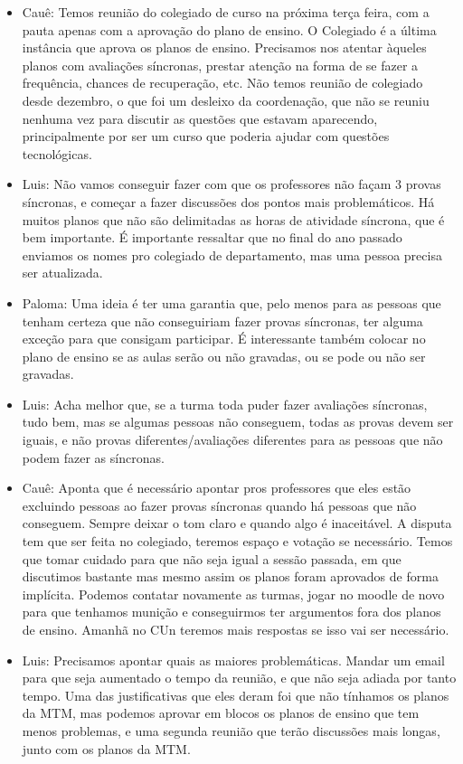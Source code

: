 \documentclass{ata-calico}
\begin{document}
\begin{itemize}
\item Cauê: Temos reunião do colegiado de curso na próxima terça feira, com a pauta apenas com a aprovação do plano de ensino. O Colegiado é a última instância que aprova os planos de ensino. Precisamos nos atentar àqueles planos com avaliações síncronas, prestar atenção na forma de se fazer a frequência, chances de recuperação, etc. Não temos reunião de colegiado desde dezembro, o que foi um desleixo da coordenação, que não se reuniu nenhuma vez para discutir as questões que estavam aparecendo, principalmente por ser um curso que poderia ajudar com questões tecnológicas.
\item Luis: Não vamos conseguir fazer com que os professores não façam 3 provas síncronas, e começar a fazer discussões dos pontos mais problemáticos. Há muitos planos que não são delimitadas as horas de atividade síncrona, que é bem importante. É importante ressaltar que no final do ano passado enviamos os nomes pro colegiado de departamento, mas uma pessoa precisa ser atualizada.
\item Paloma: Uma ideia é ter uma garantia que, pelo menos para as pessoas que tenham certeza que não conseguiriam fazer provas síncronas, ter alguma exceção para que consigam participar. É interessante também colocar no plano de ensino se as aulas serão ou não gravadas, ou se pode ou não ser gravadas.
\item Luis: Acha melhor que, se a turma toda puder fazer avaliações síncronas, tudo bem, mas se algumas pessoas não conseguem, todas as provas devem ser iguais, e não provas diferentes/avaliações diferentes para as pessoas que não podem fazer as síncronas.
\item Cauê: Aponta que é necessário apontar pros professores que eles estão excluindo pessoas ao fazer provas síncronas quando há pessoas que não conseguem. Sempre deixar o tom claro e quando algo é inaceitável. A disputa tem que ser feita no colegiado, teremos espaço e votação se necessário. Temos que tomar cuidado para que não seja igual a sessão passada, em que discutimos bastante mas mesmo assim os planos foram aprovados de forma implícita. Podemos contatar novamente as turmas, jogar no moodle de novo para que tenhamos munição e conseguirmos ter argumentos fora dos planos de ensino. Amanhã no CUn teremos mais respostas se isso vai ser necessário.
\item Luis: Precisamos apontar quais as maiores problemáticas. Mandar  um email para que seja aumentado o tempo da reunião, e que não seja adiada por tanto tempo. Uma das justificativas que eles deram foi que não tínhamos os planos da MTM, mas podemos aprovar em blocos os planos de ensino que tem menos problemas, e uma segunda reunião que terão discussões mais longas, junto com os planos da MTM.

\end{itemize}
\end{document}
